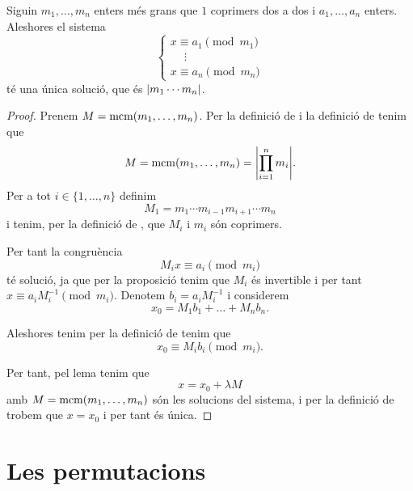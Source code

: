 \documentclass[../Apunts.tex]{subfiles}
\begin{document}
	\begin{theorem}
		\label{thm:TXR}\label{thm:Teorema xinès de les restes}
		Siguin \(m_{1},\dots,m_{n}\) enters més grans que \(1\) coprimers dos a dos i \(a_{1},\dots,a_{n}\) enters. Aleshores el sistema
		\[\begin{cases}
		x\equiv a_{1}\pmod{m_{1}}\\
		\quad\ \vdots\\
		x\equiv a_{n}\pmod{m_{n}}
		\end{cases}\]
		té una única solució, que és \(\abs{m_{1}\cdots m_{n}}\).
		\begin{proof}
			Prenem \(M=\operatorname{mcm}(m_{1},\dots,m_{n})\). Per la definició de  i la definició de  tenim que \[M=\mcm(m_{1},\dots,m_{n})=\abs{\prod_{i=1}^{n}m_{i}}.\]
			Per a tot \(i\in\{1,\dots,n\}\) definim
			\[M_{1}=m_{1}\cdots m_{i-1}m_{i+1}\cdots m_{n}\]
			i tenim, per la definició de , que \(M_{i}\) i \(m_{i}\) són coprimers.
			
			Per tant la congruència
			\[M_{i}x\equiv a_{i}\pmod{m_{i}}\]
			té solució, ja que per la proposició  tenim que \(M_{i}\) és invertible i per tant \(x\equiv a_{i}M_{i}^{-1}\pmod{m_{i}}\). Denotem \(b_{i}=a_{i}M_{i}^{-1}\) i considerem
			\[x_{0}=M_{1}b_{1}+\dots+M_{n}b_{n}.\]
			
			Aleshores tenim per la definició de  tenim que
			\[x_{0}\equiv M_{i}b_{i}\pmod{m_{i}}.\]
			
			Per tant, pel lema  tenim que
			\[x=x_{0}+\lambda M\]
			amb \(M=\operatorname{mcm}(m_{1},\dots,m_{n})\) són les solucions del sistema, i per la definició de  trobem que \(x=x_{0}\) i per tant és única.
		\end{proof}
	\end{theorem}
	\section{Les permutacions}
\end{document}
